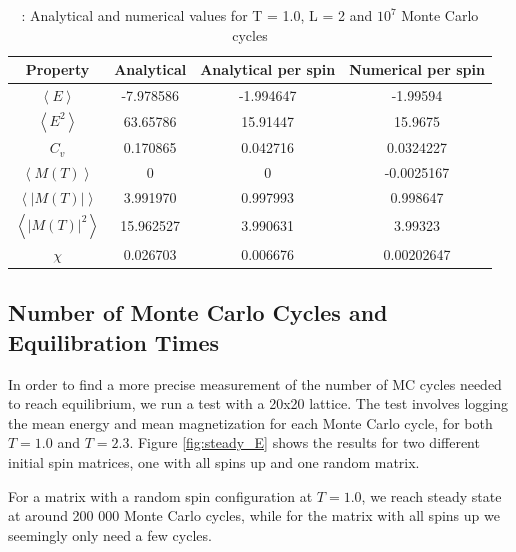 \documentclass{article}
\begin{document}
	{\renewcommand{\arraystretch}{1.5}
	\begin{table}[h!]
		\caption{: Analytical and numerical values for T = 1.0, L = 2 and $10^7$ Monte Carlo cycles }
			\label{Tab: values}
			\centering
		\begin{tabular}{c c c c}
			Property & Analytical & Analytical per spin & Numerical per spin \\
			\hline
			$\left<E\right>$ & -7.978586  & -1.994647 & -1.99594\\
			$\left<E^2\right>$ & 63.65786 & 15.91447 &15.9675 \\
			$C_v$ & 0.170865 & 0.042716 & 0.0324227 \\
			$\left<M(T)\right>$  & 0 & 0 & -0.0025167\\
			$\left<|M(T)|\right>$ & 3.991970 & 0.997993 & 0.998647 \\
			$\left<|M(T)|^2\right> $ & 15.962527 & 3.990631 & 3.99323\\
			$\chi$ & 0.026703 & 0.006676 & 0.00202647\\
		\end{tabular}
	\end{table}

	\subsection{Number of Monte Carlo Cycles and Equilibration Times}
		In order to find a more precise measurement of the number of MC cycles needed to reach equilibrium, we run a test with a 20x20 lattice. The test involves logging the mean energy and mean magnetization for each Monte Carlo cycle, for both $T=1.0$ and $T=2.3$. Figure \ref{fig:steady_E} shows the results for two different initial spin matrices, one with all spins up and one random matrix.

		For a matrix with a random spin configuration at $T=1.0$, we reach steady state at around 200 000 Monte Carlo cycles, while for the matrix with all spins up we seemingly only need a few cycles.

}
\end{document}
